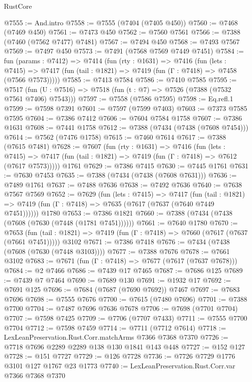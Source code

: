 \begin{lexlean}{RustCore}
\begin{coremodule}
@7555 := And.intro
@7558 := @7555 (@7404 (@7405 @450))
@7560 := @7468 (@7469 @450)
@7561 := @7473 @450
@7562 := @7560 @7561
@7566 := @7388 (@7460 (@7562 @7477) @7481)
@7567 := @7494 @450
@7568 := @7493 @7567
@7569 := @7497 @450
@7573 := @7491 (@7568 @7569 @7449 @7451)
@7584 := fun (params : @7412) =>
  @7414
    (fun (rty : @1631) =>
    @7416
      (fun (lets : @7415) =>
      @7417 (fun (tail : @1821) => @7419 (fun (Γ : @7418) => @7458 (@7566 @7573)))))
@7585 := @7413 @7584
@7586 := @7410 @7585
@7595 := @7517 (fun (U : @7516) => @7518 (fun (t : @7) => @7526 (@7388 (@7532 @7561 @7406) @7543)))
@7597 := @7558 (@7586 @7595)
@7598 := Eq.refl.{1}
@7599 := @7598 @7391
@7601 := @7597 (@7599 @7403)
@7603 := @7373 @7585 @7595
@7604 := @7386 @7412
@7606 := @7604 @7584 @1758
@7607 := @7386 @1631
@7608 := @7441 @1758
@7612 := @7388 (@7434 (@7438 (@7608 @7454)))
@7614 := @7562 (@7476 @1758)
@7615 := @7460 @7614
@7617 := @7388 (@7615 @7481)
@7628 := @7607
    (fun (rty : @1631) =>
    @7416
      (fun (lets : @7415) =>
      @7417 (fun (tail : @1821) => @7419 (fun (Γ : @7418) => @7612 (@7617 @7573)))))
    @1761
@7629 := @7386 @7415
@7630 := @7445 @1761
@7631 := @7630 @7453
@7635 := @7388 (@7434 (@7438 (@7608 @7631)))
@7636 := @7489 @1761
@7637 := @7488 @7636
@7638 := @7492 @7636
@7640 := @7638 @7567 @7569
@7652 := @7629
    (fun (lets : @7415) =>
    @7417
      (fun (tail : @1821) => @7419 (fun (Γ : @7418) => @7635 (@7617 (@7637 (@7640 @7449 @7451))))))
    @1780
@7653 := @7386 @1821
@7660 := @7388 (@7434 (@7438 (@7608 (@7630 (@7448 (@1781 @7451))))))
@7661 := @7640 @1780
@7670 := @7653
    (fun (tail : @1821) => @7419 (fun (Γ : @7418) => @7660 (@7617 (@7637 (@7661 @7451)))))
    @3102
@7671 := @7386 @7418
@7676 := @7434 (@7438 (@7608 (@7630 (@7448 @3103))))
@7677 := @7388 @7676
@7678 := @7661 @3102
@7683 := @7671 (fun (Γ : @7418) => @7677 (@7617 (@7637 @7678)))
@7684 := @2 @7466
@7686 := @7439 @17 @7465
@7687 := @7686 @125
@7689 := @7439 @7 @7464
@7690 := @7689 @130
@7691 := @1932 @17
@7692 := @7691 @125
@7696 := @7684 (@7687 (@7690 @7692)) @7467
@7697 := @7683 @7696
@7698 := @7555 @7676
@7700 := @7615 (@7480 @7696)
@7701 := @7388 @7700
@7704 := @7487 @7696 @7636 @7678
@7706 := @7698 (@7701 @7704)
@7707 := @7598 @7425
@7709 := @7706 (@7707 @7433)
@7711 := @7555 @7700 @7704
@7712 := @7598 @7459
@7714 := @7711 (@7712 @7614)
@7718 := LexLeanPreservation.Rust.Corr.matchArms @7366 @7368 @7370
@7726 := @7718 @7696 @2289 @2289 @138 @130 @1841 @143 @448
@7727 := @152 @127
@7728 := @151 @7727
@7729 := @126 @7728
@7736 := @7726 @7729 @1776 @3101 @127 @1767 @23 @1773
@7740 := LexLeanPreservation.Rust.Corr.var @7366 @7368 @7370

\end{coremodule}
\end{lexlean}
